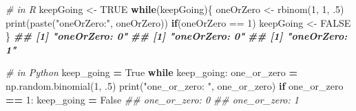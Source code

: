 \documentclass[
  12pt,
  krantz2]{krantz}
\makeatletter
\newenvironment{Shaded}{\begin{snugshade}}{\end{snugshade}}
\newcommand{\BuiltInTok}[1]{#1}
\newcommand{\CommentTok}[1]{\textcolor[rgb]{0.37,0.37,0.37}{\textit{#1}}}
\newcommand{\ConstantTok}[1]{\textcolor[rgb]{0,0,0}{#1}}
\newcommand{\ControlFlowTok}[1]{\textcolor[rgb]{0.27,0.27,0.27}{\textbf{#1}}}
\newcommand{\DecValTok}[1]{\textcolor[rgb]{0.06,0.06,0.06}{#1}}
\newcommand{\DocumentationTok}[1]{\textcolor[rgb]{0.37,0.37,0.37}{\textbf{\textit{#1}}}}
\newcommand{\FloatTok}[1]{\textcolor[rgb]{0.06,0.06,0.06}{#1}}
\newcommand{\FunctionTok}[1]{\textcolor[rgb]{0,0,0}{#1}}
\newcommand{\NormalTok}[1]{#1}
\newcommand{\OperatorTok}[1]{\textcolor[rgb]{0.43,0.43,0.43}{\textbf{#1}}}
\newcommand{\OtherTok}[1]{\textcolor[rgb]{0.37,0.37,0.37}{#1}}
\newcommand{\SpecialCharTok}[1]{\textcolor[rgb]{0,0,0}{#1}}
\newcommand{\StringTok}[1]{\textcolor[rgb]{0.5,0.5,0.5}{#1}}
\newcommand{\VariableTok}[1]{\textcolor[rgb]{0,0,0}{#1}}
\newenvironment{kframe}{%
\medskip{}
\setlength{\fboxsep}{.8em}
 \def\at@end@of@kframe{}%
 \ifinner\ifhmode%
  \def\at@end@of@kframe{\end{minipage}}%
  \begin{minipage}{\columnwidth}%
 \fi\fi%
 \def\FrameCommand##1{\hskip\@totalleftmargin \hskip-\fboxsep
 \colorbox{shadecolor}{##1}\hskip-\fboxsep
     \hskip-\linewidth \hskip-\@totalleftmargin \hskip\columnwidth}%
 \MakeFramed {\advance\hsize-\width
   \@totalleftmargin\z@ \linewidth\hsize
   \@setminipage}}%
 {\par\unskip\endMakeFramed%
 \at@end@of@kframe}
\renewenvironment{Shaded}{\begin{kframe}}{\end{kframe}}
\makeatother
\begin{document}
\begin{Shaded}
\begin{Highlighting}[]
\CommentTok{\# in R}
\NormalTok{keepGoing }\OtherTok{\textless{}{-}} \ConstantTok{TRUE}
\ControlFlowTok{while}\NormalTok{(keepGoing)\{}
\NormalTok{  oneOrZero }\OtherTok{\textless{}{-}} \FunctionTok{rbinom}\NormalTok{(}\DecValTok{1}\NormalTok{, }\DecValTok{1}\NormalTok{, .}\DecValTok{5}\NormalTok{)}
  \FunctionTok{print}\NormalTok{(}\FunctionTok{paste}\NormalTok{(}\StringTok{"oneOrZero:"}\NormalTok{, oneOrZero))}
  \ControlFlowTok{if}\NormalTok{(oneOrZero }\SpecialCharTok{==} \DecValTok{1}\NormalTok{)}
\NormalTok{    keepGoing }\OtherTok{\textless{}{-}} \ConstantTok{FALSE}
\NormalTok{\}}
\DocumentationTok{\#\# [1] "oneOrZero: 0"}
\DocumentationTok{\#\# [1] "oneOrZero: 0"}
\DocumentationTok{\#\# [1] "oneOrZero: 1"}
\end{Highlighting}
\end{Shaded}

\begin{Shaded}
\begin{Highlighting}[]
\CommentTok{\# in Python}
\NormalTok{keep\_going }\OperatorTok{=} \VariableTok{True}
\ControlFlowTok{while}\NormalTok{ keep\_going:}
\NormalTok{    one\_or\_zero }\OperatorTok{=}\NormalTok{ np.random.binomial(}\DecValTok{1}\NormalTok{, }\FloatTok{.5}\NormalTok{) }
    \BuiltInTok{print}\NormalTok{(}\StringTok{"one\_or\_zero: "}\NormalTok{, one\_or\_zero)}
    \ControlFlowTok{if}\NormalTok{ one\_or\_zero }\OperatorTok{==} \DecValTok{1}\NormalTok{:}
\NormalTok{        keep\_going }\OperatorTok{=} \VariableTok{False}
\CommentTok{\#\# one\_or\_zero:  0}
\CommentTok{\#\# one\_or\_zero:  1}
\end{Highlighting}
\end{Shaded}
\end{document}
